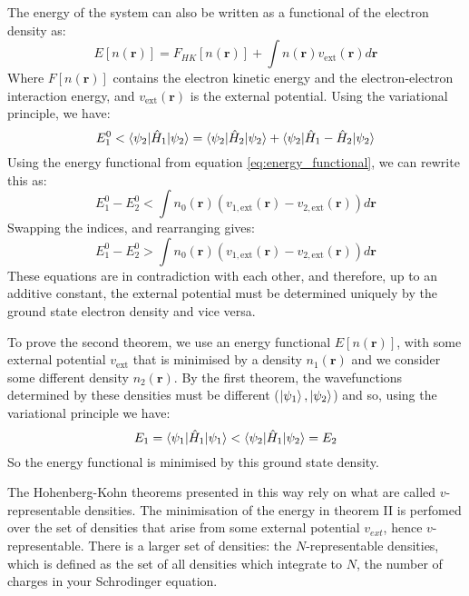 \documentclass[12pt]{article}
\begin{document}
The energy of the system can also be written as a functional of the electron density as:
\begin{equation}\label{eq:energy_functional}
E[n(\mathbf r)] = F_{HK}[n(\mathbf r)]+ \int n(\mathbf r)v_{\mathrm{ext}}(\mathbf r)d\mathbf r
\end{equation}
Where $F[n(\mathbf r)]$ contains the electron kinetic energy and the electron-electron interaction energy, and $v_{\mathrm{ext}}(\mathbf r)$ is the external potential.
Using the variational principle, we have:
\begin{equation} 
	E^0_1 < \braket{\psi_2 | \hat H_1 | \psi_2} = \braket{\psi_2 | \hat H_2 | \psi_2} + \braket{\psi_2 |\hat H_1 - \hat H_2 |\psi_2}
\end{equation}
Using the energy functional from equation \ref{eq:energy_functional}, we can rewrite this as:
\begin{equation}\label{eq:contra_1}
E^0_1 - E^0_2 < \int n_0(\mathbf r)(v_{1,\mathrm{ext}}(\mathbf r)-v_{2,\mathrm{ext}}(\mathbf r)) d\mathbf r
\end{equation}
Swapping the indices, and rearranging gives:
\begin{equation}
E^0_1 - E^0_2 > \int n_0(\mathbf r)(v_{1,\mathrm{ext}}(\mathbf r)-v_{2,\mathrm{ext}}(\mathbf r)) d\mathbf r
\end{equation}
These equations are in contradiction with each other, and therefore, up to an additive constant, the external potential must be determined uniquely by the ground state electron density and vice versa.

To prove the second theorem, we use an energy functional $E[n(\mathbf r)]$, with some external potential $v_{\mathrm{ext}}$ that is minimised by a density $n_1(\mathbf r)$ and we consider some different density $n_2(\mathbf r)$. 
By the first theorem, the wavefunctions determined by these densities must be different ($\ket{\psi_1}, \ket{\psi_2}$) and so, using the variational principle we have:
\begin{equation}\label{eq:hk_2}
E_1 = \braket{\psi_1 | \hat H _1 | \psi_1} < \braket{\psi_2 | \hat H _1 | \psi_2} = E_2
\end{equation}
So the energy functional is minimised by this ground state density.

The Hohenberg-Kohn theorems presented in this way rely on what are called $v$-representable densities. The minimisation of the energy in theorem II is perfomed over the set of densities that arise from some external potential $v_{ext}$, hence $v$-representable. There is a larger set of densities: the $N$-representable densities, which is defined as the set of all densities which integrate to $N$, the number of charges in your Schrodinger equation.
\end{document}
